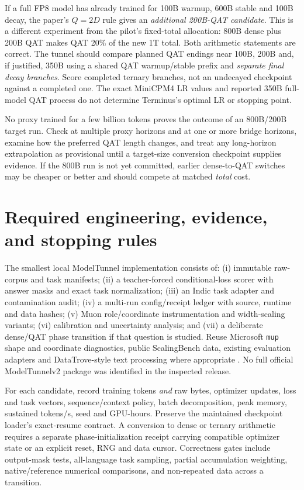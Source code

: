 \documentclass[10pt,a4paper]{article}
\begin{document}
If a full FP8 model has already trained for 100B warmup, 600B stable and 100B decay, the paper's $Q=2D$ rule gives an \emph{additional 200B-QAT candidate}. This is a different experiment from the pilot's fixed-total allocation: 800B dense plus 200B QAT makes QAT 20\% of the new 1T total. Both arithmetic statements are correct. The tunnel should compare planned QAT endings near 100B, 200B and, if justified, 350B using a shared QAT warmup/stable prefix and \emph{separate final decay branches}. Score completed ternary branches, not an undecayed checkpoint against a completed one. The exact MiniCPM4 LR values and reported 350B full-model QAT process do not determine Terminus's optimal LR or stopping point.

No proxy trained for a few billion tokens proves the outcome of an 800B/200B target run. Check at multiple proxy horizons and at one or more bridge horizons, examine how the preferred QAT length changes, and treat any long-horizon extrapolation as provisional until a target-size conversion checkpoint supplies evidence. If the 800B run is not yet committed, earlier dense-to-QAT switches may be cheaper or better and should compete at matched \emph{total} cost.

\section{Required engineering, evidence, and stopping rules}
\label{sec:implementation}

The smallest local ModelTunnel implementation consists of: (i) immutable raw-corpus and task manifests; (ii) a teacher-forced conditional-loss scorer with answer masks and exact task normalization; (iii) an Indic task adapter and contamination audit; (iv) a multi-run config/receipt ledger with source, runtime and data hashes; (v) Muon role/coordinate instrumentation and width-scaling variants; (vi) calibration and uncertainty analysis; and (vii) a deliberate dense/QAT phase transition if that question is studied. Reuse Microsoft \texttt{mup} shape and coordinate diagnostics, public ScalingBench data, existing evaluation adapters and DataTrove-style text processing where appropriate \cite{mup,lmeval,datatrove}. No full official ModelTunnelv2 package was identified in the inspected release.

For each candidate, record training tokens \emph{and} raw bytes, optimizer updates, loss and task vectors, sequence/context policy, batch decomposition, peak memory, sustained tokens/s, seed and GPU-hours. Preserve the maintained checkpoint loader's exact-resume contract. A conversion to dense or ternary arithmetic requires a separate phase-initialization receipt carrying compatible optimizer state or an explicit reset, RNG and data cursor. Correctness gates include output-mask tests, all-language task sampling, partial accumulation weighting, native/reference numerical comparisons, and non-repeated data across a transition.
\end{document}

